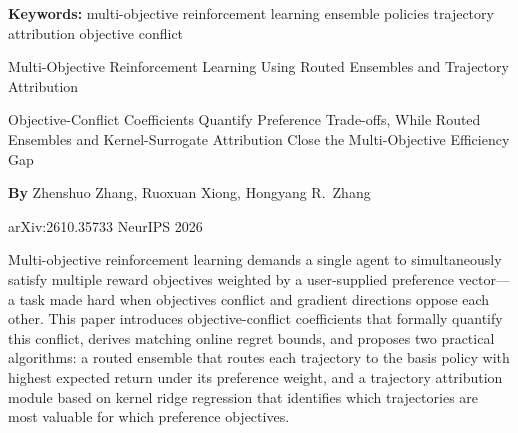 \documentclass[10pt,twocolumn]{article}
\begin{document}
\setlength{\parindent}{0pt}
\setlength{\parskip}{4pt}

{\small\color{keywordgray}\textbf{Keywords:}
  multi-objective reinforcement learning \textbullet{}
  ensemble policies \textbullet{}
  trajectory attribution \textbullet{}
  objective conflict}\par\vspace{4pt}

{\LARGE\bfseries\raggedright
  Multi-Objective Reinforcement Learning Using Routed
  Ensembles and Trajectory Attribution}\par\vspace{4pt}

{\large\itshape\raggedright
  Objective-Conflict Coefficients Quantify Preference Trade-offs, While
  Routed Ensembles and Kernel-Surrogate Attribution Close the
  Multi-Objective Efficiency Gap}\par\vspace{6pt}

{\small\textbf{By} Zhenshuo Zhang, Ruoxuan Xiong, Hongyang R.\ Zhang}\par\vspace{2pt}

{\small\color{keywordgray}arXiv:2610.35733 \textbullet{}
  NeurIPS 2026}
\par\vspace{2pt}\noindent{\color{rulered}\rule{\columnwidth}{0.6pt}}\vspace{6pt}

Multi-objective reinforcement learning demands a single agent to
simultaneously satisfy multiple reward objectives weighted by a
user-supplied preference vector---a task made hard when objectives
conflict and gradient directions oppose each other. This paper
introduces objective-conflict coefficients that formally quantify
this conflict, derives matching online regret bounds, and proposes
two practical algorithms: a routed ensemble that routes each trajectory
to the basis policy with highest expected return under its preference
weight, and a trajectory attribution module based on kernel ridge
regression that identifies which trajectories are most valuable for
which preference objectives.
\end{document}

